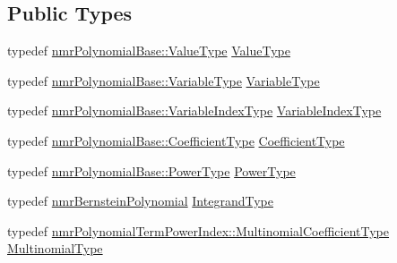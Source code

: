 \subsection*{Public Types}
\begin{DoxyCompactItemize}
\item 
typedef \hyperlink{classnmr_polynomial_base_a72f0bc16b225e4708bcf15a77ba206e3}{nmr\+Polynomial\+Base\+::\+Value\+Type} \hyperlink{classnmr_bernstein_polynomial_line_integral_ab1d3f80540e0791f359e53b3ef074a86}{Value\+Type}
\item 
typedef \hyperlink{classnmr_polynomial_base_a666e909572cf22856c965d47f243a633}{nmr\+Polynomial\+Base\+::\+Variable\+Type} \hyperlink{classnmr_bernstein_polynomial_line_integral_a229f7cb4c93c33c1b2a3de23d4f3460b}{Variable\+Type}
\item 
typedef \hyperlink{classnmr_polynomial_base_aae95477e451ddc7d3ee3f41cbdaadde2}{nmr\+Polynomial\+Base\+::\+Variable\+Index\+Type} \hyperlink{classnmr_bernstein_polynomial_line_integral_a125fa9ed7f5718e92272974aee68b27a}{Variable\+Index\+Type}
\item 
typedef \hyperlink{classnmr_polynomial_base_a8693efdfc8585ccb49abea69f74f3eef}{nmr\+Polynomial\+Base\+::\+Coefficient\+Type} \hyperlink{classnmr_bernstein_polynomial_line_integral_a0dc7480d6f60af6d3d8da6e32444edf7}{Coefficient\+Type}
\item 
typedef \hyperlink{classnmr_polynomial_base_a58607c884bf2e6725a77ed4d9e14ba26}{nmr\+Polynomial\+Base\+::\+Power\+Type} \hyperlink{classnmr_bernstein_polynomial_line_integral_a0e07aee2cb7c5f3f5d2c1f95cd4e9abf}{Power\+Type}
\item 
typedef \hyperlink{classnmr_bernstein_polynomial}{nmr\+Bernstein\+Polynomial} \hyperlink{classnmr_bernstein_polynomial_line_integral_a5c7945eacbf7d3d225de9d11bbac138c}{Integrand\+Type}
\item 
typedef \hyperlink{classnmr_polynomial_term_power_index_a09f482da776cfb829e26ad1fb381ab94}{nmr\+Polynomial\+Term\+Power\+Index\+::\+Multinomial\+Coefficient\+Type} \hyperlink{classnmr_bernstein_polynomial_line_integral_a284a932e77c5c38a5d6959c4992d5300}{Multinomial\+Type}
\end{DoxyCompactItemize}
